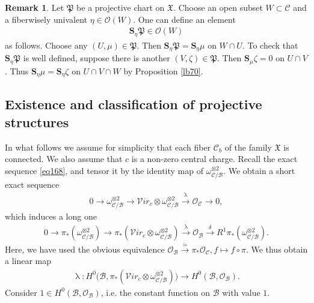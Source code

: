 \documentclass[12pt,b5paper,notitlepage]{report}
\theoremstyle{definition}
\newtheorem{rem}[df]{Remark}
\theoremstyle{plain}
\newcommand{\fk}{\mathfrak}
\newcommand{\mc}{\mathcal}
\newcommand{\scr}{\mathscr}
\newcommand{\svir}{\mathcal V\!\mathit{ir}}
\newcommand{\Sbf}{\mathbf{S}}
\numberwithin{equation}{section}
\begin{document}
\begin{rem}\label{lb75}
	Let $\fk P$ be a projective chart on $\fk X$. Choose an open subset $W\subset\mc C$ and a fiberwisely univalent $\eta\in\scr O(W)$. One can \index{S@$\Sbf_\eta f,\Sbf_\eta\fk P$} define an element 
	\begin{align*}
	\Sbf_\eta\fk P\in \scr O(W)
	\end{align*}
	as follows. Choose any $(U,\mu)\in\fk P$. Then $\Sbf_\eta\fk P=\Sbf_\eta\mu$ on $W\cap U$. To check that $\Sbf_\eta\fk P$ is well defined, suppose there is another $(V,\zeta)\in\fk P$. Then $\Sbf_\mu\zeta=0$ on $U\cap V$. Thus $\Sbf_\eta\mu=\Sbf_\eta\zeta$ on $U\cap V\cap W$ by Proposition \ref{lb70}.
\end{rem}



\subsection*{Existence and classification of projective structures}



In what follows we assume for simplicity that each fiber $\mc C_b$ of the family $\fk X$ is connected. We also assume that $c$ is a non-zero central charge. Recall the exact sequence \eqref{eq168}, and tensor it by the identity map of  $\omega_{\mc C/\mc B}^{\otimes 2}$. We obtain a short  exact sequence
\begin{align}
0\rightarrow \omega_{\mc C/\mc B}^{\otimes 2}\rightarrow\svir_c\otimes \omega_{\mc C/\mc B}^{\otimes 2}\xrightarrow{\uplambda}\scr O_{\mc C}\rightarrow 0,\label{eq174}
\end{align}
which induces a long one
\begin{align}
0\rightarrow\pi_*(\omega_{\mc C/\mc B}^{\otimes 2})\rightarrow \pi_*(\svir_c\otimes \omega_{\mc C/\mc B}^{\otimes 2})\xrightarrow{\uplambda} \scr O_{\mc B}\xrightarrow{\delta} R^1\pi_*(\omega_{\mc C/\mc B}^{\otimes 2}).\label{eq236}
\end{align}
Here, we have used the obvious equivalence $\scr O_{\mc B}\xrightarrow{\simeq}\pi_*\scr O_{\mc C},f\mapsto f\circ\pi$. We thus obtain a linear map
\begin{align}
\uplambda:H^0\big(\mc B,\pi_*(\svir_c\otimes \omega_{\mc C/\mc B}^{\otimes 2})\big)\rightarrow  H^0(\mc B,\scr O_{\mc B}).
\end{align}
Consider $1\in H^0(\mc B,\scr O_{\mc B})$, i.e. the constant function on $\mc B$ with value $1$.
\end{document}
